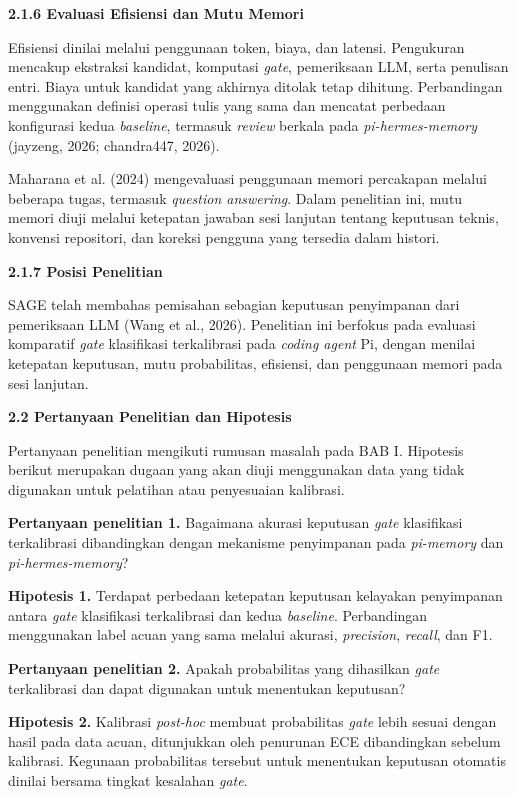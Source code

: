 \documentclass[12pt,a4paper]{article}
\newcommand{\asing}[1]{\textit{#1}}
\newcommand{\pim}{\textit{pi-memory}}
\newcommand{\phm}{\textit{pi-hermes-memory}}
\newcommand{\subbab}[2]{%
  \par\vspace{0.8em}\phantomsection\label{#2}%
  \noindent\textbf{#1}\par\nopagebreak\vspace{0.3em}}
\newcommand{\subsubbab}[2]{%
  \par\vspace{0.5em}\phantomsection\label{#2}%
  \noindent\textbf{#1}\par\nopagebreak\vspace{0.2em}}
\begin{document}
\subsubbab{2.1.6 Evaluasi Efisiensi dan Mutu Memori}{sec:2.1.6}

Efisiensi dinilai melalui penggunaan token, biaya, dan latensi. Pengukuran mencakup ekstraksi kandidat, komputasi \asing{gate}, pemeriksaan LLM, serta penulisan entri. Biaya untuk kandidat yang akhirnya ditolak tetap dihitung. Perbandingan menggunakan definisi operasi tulis yang sama dan mencatat perbedaan konfigurasi kedua \asing{baseline}, termasuk \asing{review} berkala pada \phm{} (jayzeng, 2026; chandra447, 2026).

Maharana et al. (2024) mengevaluasi penggunaan memori percakapan melalui beberapa tugas, termasuk \asing{question answering}. Dalam penelitian ini, mutu memori diuji melalui ketepatan jawaban sesi lanjutan tentang keputusan teknis, konvensi repositori, dan koreksi pengguna yang tersedia dalam histori.

\subsubbab{2.1.7 Posisi Penelitian}{sec:2.1.7}

SAGE telah membahas pemisahan sebagian keputusan penyimpanan dari pemeriksaan LLM (Wang et al., 2026). Penelitian ini berfokus pada evaluasi komparatif \asing{gate} klasifikasi terkalibrasi pada \asing{coding agent} Pi, dengan menilai ketepatan keputusan, mutu probabilitas, efisiensi, dan penggunaan memori pada sesi lanjutan.

\subbab{2.2 Pertanyaan Penelitian dan Hipotesis}{sec:2.2}

Pertanyaan penelitian mengikuti rumusan masalah pada BAB I. Hipotesis berikut merupakan dugaan yang akan diuji menggunakan data yang tidak digunakan untuk pelatihan atau penyesuaian kalibrasi.

\textbf{Pertanyaan penelitian 1.} Bagaimana akurasi keputusan \asing{gate} klasifikasi terkalibrasi dibandingkan dengan mekanisme penyimpanan pada \pim{} dan \phm{}?

\textbf{Hipotesis 1.} Terdapat perbedaan ketepatan keputusan kelayakan penyimpanan antara \asing{gate} klasifikasi terkalibrasi dan kedua \asing{baseline}. Perbandingan menggunakan label acuan yang sama melalui akurasi, \asing{precision}, \asing{recall}, dan F1.

\textbf{Pertanyaan penelitian 2.} Apakah probabilitas yang dihasilkan \asing{gate} terkalibrasi dan dapat digunakan untuk menentukan keputusan?

\textbf{Hipotesis 2.} Kalibrasi \asing{post-hoc} membuat probabilitas \asing{gate} lebih sesuai dengan hasil pada data acuan, ditunjukkan oleh penurunan ECE dibandingkan sebelum kalibrasi. Kegunaan probabilitas tersebut untuk menentukan keputusan otomatis dinilai bersama tingkat kesalahan \asing{gate}.
\end{document}
